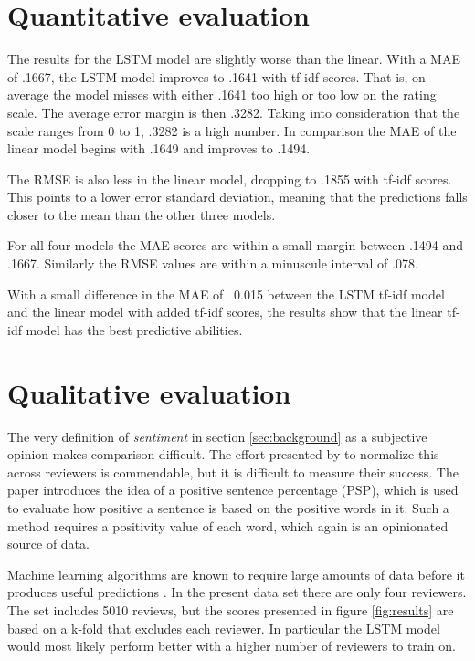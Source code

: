 \documentclass[a4paper]{article}
\begin{document}
\section{Quantitative evaluation}
The results for the LSTM model are slightly worse than the linear. With a MAE
of .1667, the LSTM model improves to .1641 with tf-idf scores. That is,
on average the model misses with either .1641 too high or too low on the
rating scale. The average error margin is then .3282. Taking into consideration
that the scale ranges from 0 to 1, .3282 is a high number.
In comparison the MAE of the linear model begins with .1649 and improves to
.1494.

The RMSE is also less in the linear model, dropping to .1855 with tf-idf scores.
This points to a lower error standard deviation, meaning that the predictions
falls closer to the mean than the other three models.

For all four models the MAE scores are within a small margin between .1494 and
.1667. Similarly the RMSE values are within a minuscule interval of .078.

With a small difference in the MAE of ~0.015 between the LSTM tf-idf model and
the linear model with added tf-idf scores, the results show that the linear
tf-idf model has the best predictive abilities.

\section{Qualitative evaluation}
The very definition of \textit{sentiment} in section \ref{sec:background} as
a subjective opinion makes comparison difficult. The effort presented by
\cite{PangLee2005} to normalize this across reviewers is commendable, but it
is difficult to measure their success. The paper introduces the idea of a positive
sentence percentage (PSP), which is used to evaluate how positive a sentence
is based on the positive words in it. Such a method requires a positivity value
of each word, which again is an opinionated source of data.

Machine learning algorithms are known to require large amounts of data before
it produces useful predictions \citep{Schmidhuber2015, Russell2009}. In the
present data set there are only four reviewers. The set includes 5010 reviews,
but the scores presented in figure \ref{fig:results} are based on a k-fold that
excludes each reviewer. In particular the LSTM model would most likely perform
better with a higher number of reviewers to train on.
\end{document}
